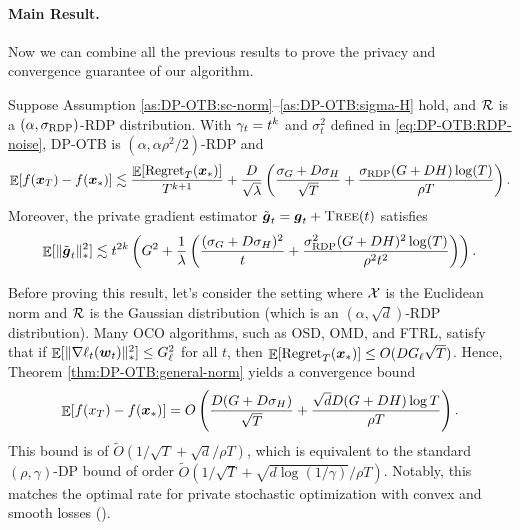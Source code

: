 \paragraph{Main Result.} Now we can combine all the previous results to prove the privacy and convergence guarantee of our algorithm.

\begin{theorem}
\label{thm:DP-OTB:general-norm}
Suppose Assumption \ref{as:DP-OTB:sc-norm}--\ref{as:DP-OTB:sigma-H} hold, and ${\cal R}$ is a $(\alpha,\sigma_{\mathrm{RDP}})$-RDP distribution. With $\gamma_t=t^k$ and $\sigma_t^2$ defined in \eqref{eq:DP-OTB:RDP-noise}, DP-OTB is $(\alpha,\alpha\rho^2/2)$-RDP and 
\begin{align*}
    \mathop{\mathbb{E}}[f({\boldsymbol{x}}_T) - f({\boldsymbol{x}}_\ast)] \lesssim 
    \frac{\mathop{\mathbb{E}}[\mathrm{Regret}_T({\boldsymbol{x}}_\ast)]}{T^{k+1}}
    + \frac{D}{\sqrt{\lambda}}\left(\frac{\sigma_G+D\sigma_H}{\sqrt{T}}+\frac{\sigma_{\mathrm{RDP}}(G+DH)\log(T)}{\rho T}\right).
\end{align*}
Moreover, the private gradient estimator $\tilde{{\boldsymbol{g}}}_t = {\boldsymbol{g}}_t + {\normalfont\textsc{Tree}}(t)$ satisfies
\begin{align*}
    \mathop{\mathbb{E}}[\|\tilde{{\boldsymbol{g}}}_t\|_\ast^2] \lesssim t^{2k}\left(G^2 + \frac{1}{\lambda}\left(\frac{(\sigma_G+D\sigma_H)^2}{t}+\frac{\sigma_{\mathrm{RDP}}^2(G+DH)^2\log(T)}{\rho^2t^2}\right) \right).
\end{align*}
\end{theorem}

Before proving this result, let's consider the setting where ${\cal X}$ is the Euclidean norm and ${\cal R}$ is the Gaussian distribution (which is an $(\alpha,\sqrt{d})$-RDP distribution). Many OCO algorithms, such as OSD, OMD, and FTRL, satisfy that if $\mathop{\mathbb{E}}[\|\nabla\ell_t({\boldsymbol{w}}_t)\|_\ast^2]\le G_\ell^2$ for all $t$, then $\mathop{\mathbb{E}}[\mathrm{Regret}_T({\boldsymbol{x}}_\ast)] \leq O(DG_\ell\sqrt{T})$. Hence, Theorem \ref{thm:DP-OTB:general-norm} yields a convergence bound
\begin{equation}
    \mathop{\mathbb{E}}[f(x_T)-f({\boldsymbol{x}}_\ast)] = O\left(\frac{D(G+D\sigma_H)}{\sqrt{T}} + \frac{\sqrt{d}D(G+DH)\log T}{\rho T}\right).
    \label{eq:DP-OTB:main:formal-bound}
\end{equation}
This bound is of $\tilde O(1/\sqrt{T}+\sqrt{d}/\rho T)$, which is equivalent to the standard $(\rho,\gamma)$-DP bound of order $\tilde O(1/\sqrt{T} + \sqrt{d\log(1/\gamma)}/\rho T)$. Notably, this matches the optimal rate for private stochastic optimization with convex and smooth losses (\cite{bassily2019private}).

